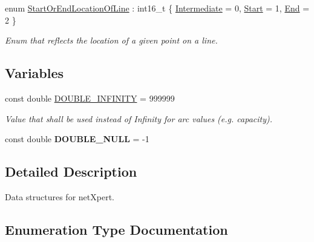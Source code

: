 \begin{DoxyCompactItemize}
\item 
enum \hyperlink{namespacenetxpert_1_1data_ad00da8a39753bf6c4a99669e8fe4c6b5}{Start\+Or\+End\+Location\+Of\+Line} \+: int16\+\_\+t \{ \hyperlink{namespacenetxpert_1_1data_ad00da8a39753bf6c4a99669e8fe4c6b5a77cbb3dd6ac4c5ba718e73763a9406ae}{Intermediate} = 0, 
\hyperlink{namespacenetxpert_1_1data_ad00da8a39753bf6c4a99669e8fe4c6b5a5f001d7b240951c70e11685adaa5f458}{Start} = 1, 
\hyperlink{namespacenetxpert_1_1data_ad00da8a39753bf6c4a99669e8fe4c6b5a463bd491ceec98a2b97103aba2ab179c}{End} = 2
 \}\begin{DoxyCompactList}\small\item\em Enum that reflects the location of a given point on a line. \end{DoxyCompactList}
\end{DoxyCompactItemize}
\subsection*{Variables}
\begin{DoxyCompactItemize}
\item 
const double \hyperlink{namespacenetxpert_1_1data_a5b545bbb8b198a5e0c3b913ede53aa6d}{D\+O\+U\+B\+L\+E\+\_\+\+I\+N\+F\+I\+N\+I\+TY} = 999999\hypertarget{namespacenetxpert_1_1data_a5b545bbb8b198a5e0c3b913ede53aa6d}{}\label{namespacenetxpert_1_1data_a5b545bbb8b198a5e0c3b913ede53aa6d}

\begin{DoxyCompactList}\small\item\em Value that shall be used instead of Infinity for arc values (e.\+g. capacity). \end{DoxyCompactList}\item 
const double {\bfseries D\+O\+U\+B\+L\+E\+\_\+\+N\+U\+LL} = -\/1\hypertarget{namespacenetxpert_1_1data_ae8ab708d7724a2b816135a527e26629a}{}\label{namespacenetxpert_1_1data_ae8ab708d7724a2b816135a527e26629a}

\end{DoxyCompactItemize}


\subsection{Detailed Description}
Data structures for net\+Xpert. 

\subsection{Enumeration Type Documentation}

